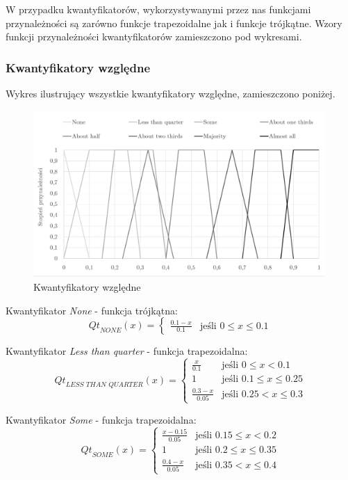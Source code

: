 \documentclass{classrep}
\begin{document}
W przypadku kwantyfikatorów, wykorzystywanymi przez nas funkcjami przynależności są zarówno funkcje trapezoidalne jak i funkcje trójkątne. Wzory funkcji przynależności kwantyfikatorów zamieszczono pod wykresami.

\subsubsection{Kwantyfikatory względne}
Wykres ilustrujący wszystkie kwantyfikatory względne, zamieszczono poniżej.
\begin{figure}[H]
	\centering
	\includegraphics[width=0.99\textwidth]{Pictures/TermsCharts/nonabsolute.png}
	\caption{Kwantyfikatory względne}
\end{figure}

Kwantyfikator \textit{None} - funkcja trójkątna:
\begin{equation}
{Qt}_{NONE}(x)= \left\{ \begin{array}{ll}
\frac{0.1-x}{0.1} 	 & \textrm{jeśli $0 \leq x \leq 0.1$}
\end{array} \right.
\end{equation}

Kwantyfikator \textit{Less than quarter} - funkcja trapezoidalna:
\begin{equation}
{Qt}_{\textit{LESS THAN QUARTER}}(x)= \left\{ \begin{array}{ll}
\frac{x}{0.1} 	& \textrm{jeśli $0 \leq x < 0.1$} \\
1 			& \textrm{jeśli $0.1 \leq x \leq 0.25$} \\
\frac{0.3-x}{0.05} 	& \textrm{jeśli $0.25 < x \leq 0.3$}
\end{array} \right.
\end{equation}

Kwantyfikator \textit{Some} - funkcja trapezoidalna:
\begin{equation}
{Qt}_{\textit{SOME}}(x)= \left\{ \begin{array}{ll}
\frac{x-0.15}{0.05} 	& \textrm{jeśli $0.15 \leq x < 0.2$} \\
1 			& \textrm{jeśli $0.2 \leq x \leq 0.35$} \\
\frac{0.4-x}{0.05} 	& \textrm{jeśli $0.35 < x \leq 0.4$}
\end{array} \right.
\end{equation}
\end{document}
